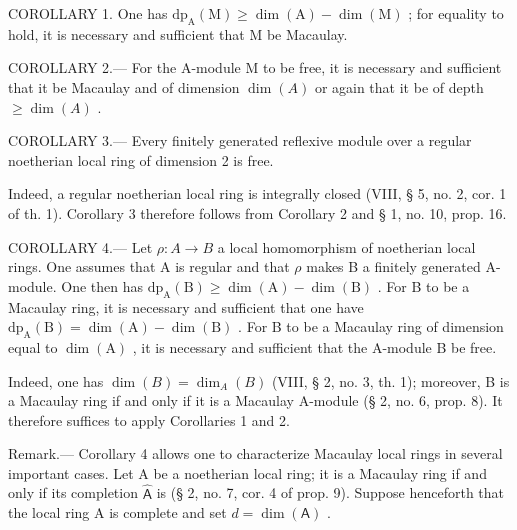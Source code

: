 COROLLARY 1. One has \(\mathrm{dp}_{\mathrm{A}}(\mathrm{M}) \geqslant \dim(\mathrm{A}) - \dim(\mathrm{M})\) ; for equality to hold, it is necessary and sufficient that M be Macaulay.

COROLLARY 2.--- For the A-module M to be free, it is necessary and sufficient that it be Macaulay and of dimension \(\dim(A)\) or again that it be of depth \(\geqslant \dim(A)\) .

COROLLARY 3.--- Every finitely generated reflexive module over a regular noetherian local ring of dimension 2 is free.

Indeed, a regular noetherian local ring is integrally closed (VIII, § 5, no. 2, cor. 1 of th. 1). Corollary 3 therefore follows from Corollary 2 and § 1, no. 10, prop. 16.

COROLLARY 4.--- Let \(\rho: A \to B\) a local homomorphism of noetherian local rings. One assumes that A is regular and that \(\rho\) makes B a finitely generated A-module. One then has \(\mathrm{dp}_{\mathrm{A}}(\mathrm{B}) \geqslant \dim(\mathrm{A}) - \dim(\mathrm{B})\) . For B to be a Macaulay ring, it is necessary and sufficient that one have \(\mathrm{dp}_{\mathrm{A}}(\mathrm{B}) = \dim(\mathrm{A}) - \dim(\mathrm{B})\) . For B to be a Macaulay ring of dimension equal to \(\dim(\mathrm{A})\) , it is necessary and sufficient that the A-module B be free.

Indeed, one has \(\dim(B) = \dim_A(B)\) (VIII, § 2, no. 3, th. 1); moreover, B is a Macaulay ring if and only if it is a Macaulay A-module (§ 2, no. 6, prop. 8). It therefore suffices to apply Corollaries 1 and 2.

Remark.--- Corollary 4 allows one to characterize Macaulay local rings in several important cases. Let A be a noetherian local ring; it is a Macaulay ring if and only if its completion \(\widehat{\mathsf{A}}\) is (§ 2, no. 7, cor. 4 of prop. 9). Suppose henceforth that the local ring A is complete and set \(d = \dim(\mathsf{A})\) .

